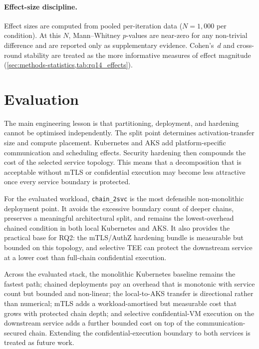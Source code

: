 \paragraph{Effect-size discipline.}
Effect sizes are computed from pooled per-iteration data
($N = 1{,}000$ per condition). At this $N$, Mann--Whitney $p$-values are
near-zero for any non-trivial difference and are reported only as
supplementary evidence. Cohen's~$d$ and cross-round stability are treated as
the more informative measures of effect magnitude
(\cref{sec:methods-statistics,tab:rq14_effects}).

\section{Evaluation}
\label{sec:analysis-evaluation}

The main engineering lesson is that partitioning, deployment, and hardening
cannot be optimised independently. The split point determines
activation-transfer size and compute placement. Kubernetes and AKS add
platform-specific communication and scheduling effects. Security hardening
then compounds the cost of the selected service topology. This means that a
decomposition that is acceptable without mTLS or confidential execution may
become less attractive once every service boundary is protected.

For the evaluated workload, \texttt{chain\_2svc} is the most defensible
non-monolithic deployment point. It avoids the excessive boundary count of
deeper chains, preserves a meaningful architectural split, and remains the
lowest-overhead chained condition in both local Kubernetes and AKS. It also
provides the practical base for RQ2: the mTLS/AuthZ hardening bundle is
measurable but bounded on this topology, and selective TEE can protect the
downstream service at a lower cost than full-chain confidential execution.

Across the evaluated stack, the monolithic Kubernetes baseline remains the
fastest path; chained deployments pay an overhead that is monotonic with
service count but bounded and non-linear; the local-to-AKS transfer is
directional rather than numerical; mTLS adds a workload-amortised but
measurable cost that grows with protected chain depth; and selective
confidential-VM execution on the downstream service adds a further bounded
cost on top of the communication-secured chain. Extending the
confidential-execution boundary to both services is treated as future work.

